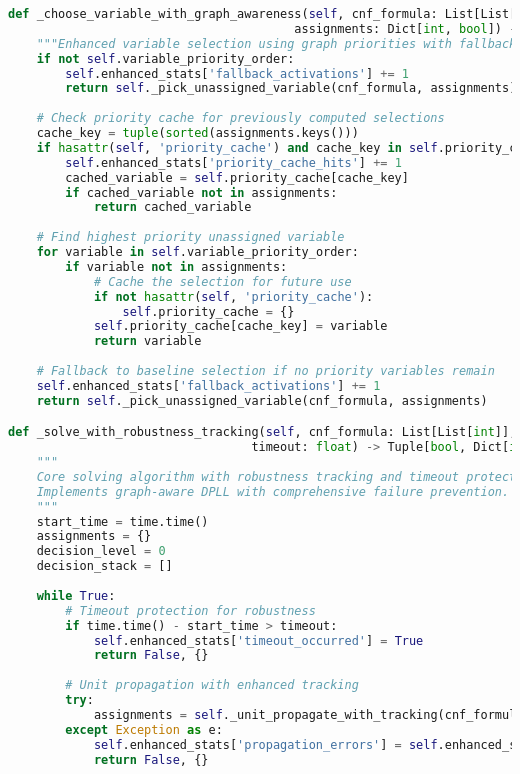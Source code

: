 \begin{lstlisting}[language=Python, caption=Graph-Aware Search Algorithm with Robustness Focus]
def _choose_variable_with_graph_awareness(self, cnf_formula: List[List[int]], 
                                        assignments: Dict[int, bool]) -> Optional[int]:
    """Enhanced variable selection using graph priorities with fallback mechanisms"""
    if not self.variable_priority_order:
        self.enhanced_stats['fallback_activations'] += 1
        return self._pick_unassigned_variable(cnf_formula, assignments)
    
    # Check priority cache for previously computed selections
    cache_key = tuple(sorted(assignments.keys()))
    if hasattr(self, 'priority_cache') and cache_key in self.priority_cache:
        self.enhanced_stats['priority_cache_hits'] += 1
        cached_variable = self.priority_cache[cache_key]
        if cached_variable not in assignments:
            return cached_variable
    
    # Find highest priority unassigned variable
    for variable in self.variable_priority_order:
        if variable not in assignments:
            # Cache the selection for future use
            if not hasattr(self, 'priority_cache'):
                self.priority_cache = {}
            self.priority_cache[cache_key] = variable
            return variable
    
    # Fallback to baseline selection if no priority variables remain
    self.enhanced_stats['fallback_activations'] += 1
    return self._pick_unassigned_variable(cnf_formula, assignments)

def _solve_with_robustness_tracking(self, cnf_formula: List[List[int]], 
                                  timeout: float) -> Tuple[bool, Dict[int, bool]]:
    """
    Core solving algorithm with robustness tracking and timeout protection.
    Implements graph-aware DPLL with comprehensive failure prevention.
    """
    start_time = time.time()
    assignments = {}
    decision_level = 0
    decision_stack = []
    
    while True:
        # Timeout protection for robustness
        if time.time() - start_time > timeout:
            self.enhanced_stats['timeout_occurred'] = True
            return False, {}
        
        # Unit propagation with enhanced tracking
        try:
            assignments = self._unit_propagate_with_tracking(cnf_formula, assignments)
        except Exception as e:
            self.enhanced_stats['propagation_errors'] = self.enhanced_stats.get('propagation_errors', 0) + 1
            return False, {}
        

\end{lstlisting}
